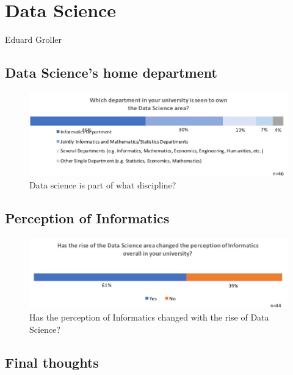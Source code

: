 \section{Data Science}

Eduard Groller

\subsection{Data Science's home department}

\begin{figure}[h]
\centering
\includegraphics[width = \linewidth]{charts/4a.jpg}
\caption{Data science is part of what discipline?}
\label{sect4:discipline}
\end{figure}

\subsection{Perception of Informatics}

\begin{figure}[h]
\centering
\includegraphics[width = \linewidth]{charts/4b.jpg}
\caption{Has the perception of Informatics changed with the rise of Data Science?}
\label{sect4:}
\end{figure}

\subsection{Final thoughts}

